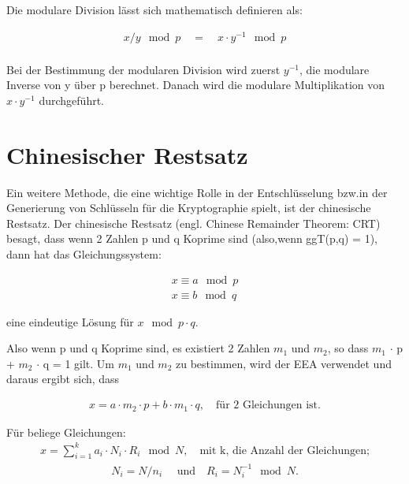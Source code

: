 Die modulare Division lässt sich mathematisch definieren als:
\begin{ceqn}
\begin{align*}
    x/y \mod p \quad = \quad x \cdot y^{-1} \mod p \\
\end{align*}
\end{ceqn}

Bei der Bestimmung der modularen Division wird zuerst $ y^{-1}$, die modulare Inverse von y über p berechnet. Danach wird die modulare Multiplikation von $ x \cdot y^{-1} $ durchgeführt.  

\section{Chinesischer Restsatz}

Ein weitere Methode, die eine wichtige Rolle in der
Entschlüsselung bzw.in der Generierung von Schlüsseln für die
Kryptographie spielt, ist der chinesische Restsatz.
Der chinesische Restsatz (engl. Chinese Remainder Theorem: CRT) besagt, dass wenn 2 Zahlen p und q Koprime
sind (also,wenn ggT(p,q) = 1), dann hat das Gleichungssystem:

\begin{ceqn}
\begin{align*}
      x \equiv a \mod p \\
      x \equiv b \mod q 
\end{align*}
\end{ceqn}
eine eindeutige Lösung für \(x \mod p \cdot q \). 

Also wenn p und q Koprime sind, es existiert 2 Zahlen $ m_1 $ und $ m_2 $, so dass $ m_1 $ $\cdot$ p + $ m_2 $ $\cdot $ q = 1 gilt. Um $ m_1 $ und  $ m_2 $ zu bestimmen, wird der EEA verwendet und daraus ergibt sich, dass

\begin{ceqn}
   \begin{align*}
       x = a \cdot m_2 \cdot p + b \cdot m_1 \cdot q, \quad \text{für 2 Gleichungen ist.}
   \end{align*}
\end{ceqn}
Für beliege Gleichungen:
\begin{align}
     x = \sum_{i=1}^{k} a_i \cdot N_i \cdot R_i \mod N, \quad \text{mit k, die Anzahl der Gleichungen;}
     \label{crt}
\end{align}
\begin{align*}
     N_i = N/n_i \quad \text{ und} \quad R_i = N_i^{-1} \mod N.
\end{align*}


